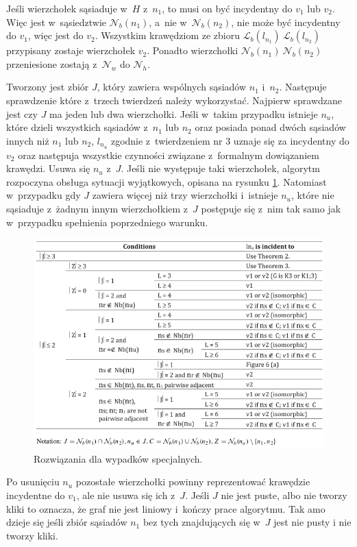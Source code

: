 \documentclass{article}
\begin{document}
Jeśli wierzchołek sąsiaduje w~$H$ z~$n_1$, to musi on być incydentny do $v_1$ lub $v_2$. Więc jest w~sąsiedztwie $\mathcal{N}_b(n_1)$, a~nie w~$\mathcal{N}_b(n_2)$, nie może być incydentny do $v_1$, więc jest do $v_2$. Wszystkim krawędziom ze zbioru $\mathcal{L}_b(l_{n_1})\ \mathcal{L}_b(l_{n_2})$ przypisany zostaje wierzchołek $v_2$. Ponadto wierzchołki $\mathcal{N}_b(n_1)\ \mathcal{N}_b(n_2)$ przeniesione zostają z~$\mathcal{N}_w$ do $\mathcal{N}_h$.

Tworzony jest zbiór $J$, który zawiera wspólnych sąsiadów $n_1$ i~$n_2$. Następuje sprawdzenie które z~trzech twierdzeń należy wykorzystać. Najpierw sprawdzane jest czy $J$ ma jeden lub dwa wierzchołki. Jeśli w~takim przypadku istnieje $n_u$, które dzieli wszystkich sąsiadów z~$n_1$ lub $n_2$ oraz posiada ponad dwóch sąsiadów innych niż $n_1$ lub $n_2$, $l_{n_u}$ zgodnie z~twierdzeniem nr 3 uznaje się za incydentny do $v_2$ oraz następuja wszystkie czynności związane z~formalnym dowiązaniem krawędzi. Usuwa się $n_u$ z~$J$. Jeśli nie występuje taki wierzchołek, algorytm rozpoczyna obsługa sytuacji wyjątkowych, opisana na rysunku \ref{fig:specCases}. Natomiast w~przypadku gdy $J$ zawiera więcej niż trzy wierzchołki i~istnieje $n_u$, które nie sąsiaduje z~żadnym innym wierzchołkiem z~$J$ postępuje się z~nim tak samo jak w~przypadku spełnienia poprzedniego warunku.

\begin{figure}[h!]
	\includegraphics[width=\linewidth]{specCases.png}
	\caption{Rozwiązania dla wypadków specjalnych.}
	\label{fig:specCases}
\end{figure}

Po usunięciu $n_u$ pozostałe wierzchołki powinny reprezentować krawędzie incydentne do $v_1$, ale nie usuwa się ich z~$J$. Jeśli $J$ nie jest puste, albo nie tworzy kliki to oznacza, że graf nie jest liniowy i~kończy prace algorytmu. Tak amo dzieje się jeśli zbiór sąsiadów $n_1$ bez tych znajdujących się w~$J$ jest nie pusty i nie tworzy kliki. 
\end{document}
